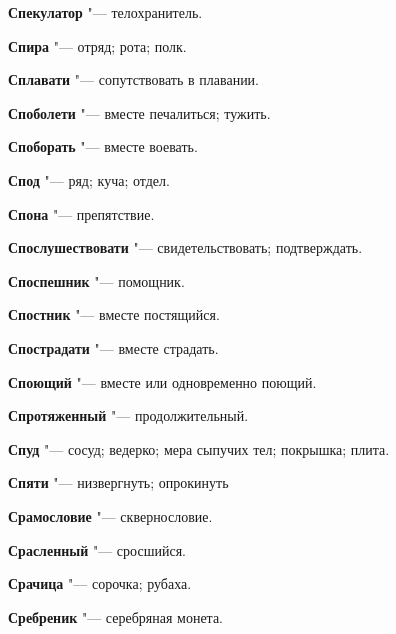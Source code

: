 \begin{mymulticols}{2}
\noindent\textbf{Спекулатор} "--- телохранитель. 




\noindent\textbf{Спира} "--- отряд; рота; полк. 




\noindent\textbf{Сплавати} "--- сопутствовать в плавании. 




\noindent\textbf{Споболети} "--- вместе печалиться; тужить. 




\noindent\textbf{Споборать} "--- вместе воевать. 




\noindent\textbf{Спод} "--- ряд; куча; отдел. 




\noindent\textbf{Спона} "--- препятствие. 




\noindent\textbf{Спослушествовати} "--- свидетельствовать; подтверждать. 




\noindent\textbf{Споспешник} "--- помощник. 




\noindent\textbf{Спостник} "--- вместе постящийся. 




\noindent\textbf{Спострадати} "--- вместе страдать. 




\noindent\textbf{Споющий} "--- вместе или одновременно поющий. 




\noindent\textbf{Спротяженный} "--- продолжительный. 




\noindent\textbf{Спуд} "--- сосуд; ведерко; мера сыпучих тел; покрышка; плита. 




\noindent\textbf{Спяти} "--- низвергнуть; опрокинуть 




\noindent\textbf{Срамословие} "--- сквернословие. 




\noindent\textbf{Срасленный} "--- сросшийся. 




\noindent\textbf{Срачица} "--- сорочка; рубаха. 




\noindent\textbf{Сребреник} "--- серебряная монета. 





\end{mymulticols}
